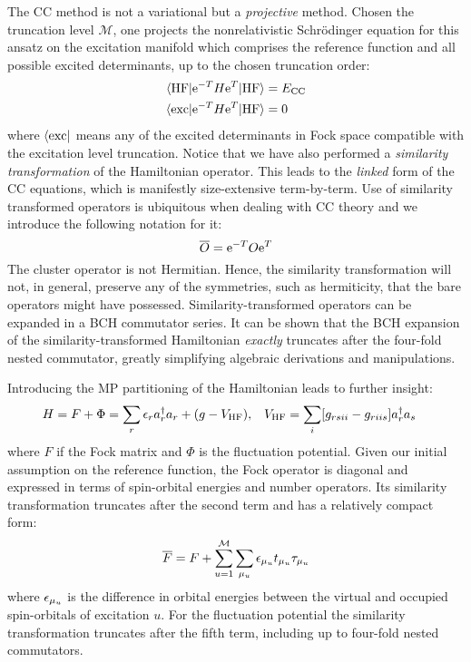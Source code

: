 The \acrshort{CC} method is not a variational but a \emph{projective} method.
Chosen the truncation level $\mathcal{M}$, one projects the
nonrelativistic Schrödinger equation for this ansatz on the excitation
manifold which comprises the reference function and all possible excited
determinants, up to the chosen truncation order:
\begin{subequations}
  \begin{align}
    \braket{\mathrm{HF} | \mathrm{e}^{-T}H\mathrm{e}^{T} | \mathrm{HF}} &= E_\mathrm{CC} \\
    \braket{\mathrm{exc} | \mathrm{e}^{-T}H\mathrm{e}^{T} | \mathrm{HF}} &= 0
  \end{align}
\end{subequations}
where $\bra{\mathrm{exc}}$ means any of the excited determinants in Fock
space compatible with the excitation level truncation.
Notice that we have also performed a \emph{similarity transformation} of
the Hamiltonian operator. This leads to the \emph{linked} form of the
\acrshort{CC} equations, which is manifestly size-extensive term-by-term.
Use of similarity transformed operators is ubiquitous when dealing with
\acrshort{CC} theory and we introduce the following notation for it:
\begin{equation}
  \overline{O} =\mathrm{e}^{-T}O\mathrm{e}^{T}
\end{equation}
The cluster operator is not Hermitian. Hence, the similarity transformation
will not, in general, preserve any of the symmetries, such as
hermiticity, that the bare operators might have possessed.
Similarity-transformed operators can be expanded in a \acrshort{BCH}
commutator series.
It can be shown that the \acrshort{BCH} expansion of the
similarity-transformed Hamiltonian \emph{exactly} truncates after the
four-fold nested commutator, greatly simplifying algebraic derivations
and manipulations.

Introducing the \gls{MP} partitioning of the Hamiltonian leads to
further insight:
\begin{alignat}{2}
 H = F + \Phi = \sum_r\epsilon_ra_{r}^{\dagger}a_{r} + (g- V_\mathrm{HF}),
 \quad&
 V_\mathrm{HF} = \sum_{i}[g_{rsii} - g_{riis}]a_{r}^{\dagger}a_{s}
\end{alignat}
where $F$ if the Fock matrix and $\Phi$ is the fluctuation potential.
Given our initial assumption on the reference function, the Fock
operator is diagonal and expressed in terms of spin-orbital energies and
number operators.
Its similarity transformation truncates after the second term and has a
relatively compact form:
\begin{equation}
  \overline{F} = F + \sum_{u=1}^\mathcal{M}\sum_{\mu_u}\epsilon_{\mu_u}t_{\mu_u}\tau_{\mu_u}
\end{equation}
where $\epsilon_{\mu_u}$ is the difference in orbital energies between the
virtual and occupied spin-orbitals of excitation $u$.
For the fluctuation potential the similarity transformation truncates
after the fifth term, including up to four-fold nested commutators.


